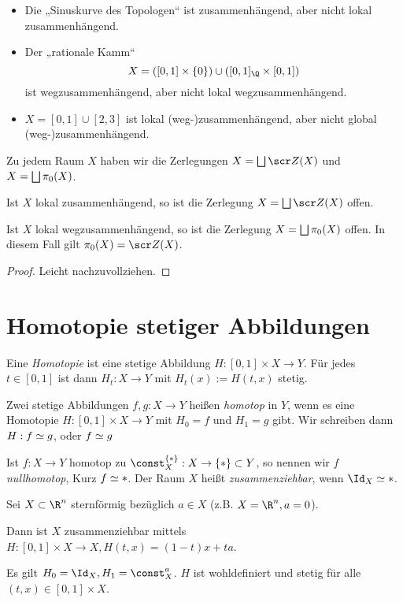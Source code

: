 \begin{ex}
	\begin{itemize}
		\item
			Die „Sinuskurve des Topologen“ %
			ist zusammenhängend, aber nicht lokal zusammenhängend.
		\item
			Der „rationale Kamm“
			\[
				X = ([0,1] \times \{0\}) \cup ([0,1]_\Q \times [0,1])
			\]
			ist wegzusammenhängend, aber nicht lokal wegzusammenhängend.
		\item
			$X = [0,1] \cup [2,3]$ ist lokal (weg-)zusammenhängend, aber nicht global (weg-)zusammenhängend.
	\end{itemize}
\end{ex}

Zu jedem Raum $X$ haben wir die Zerlegungen $X = \bigdunion \scr Z(X)$ und $X = \bigsqcup \pi_0(X)$.

\begin{st}
	Ist $X$ lokal zusammenhängend, so ist die Zerlegung $X = \bigdunion \scr Z(X)$ offen.

	Ist $X$ lokal wegzusammenhängend, so ist die Zerlegung $X = \bigsqcup \pi_0(X)$ offen.
	In diesem Fall gilt $\pi_0(X) = \scr Z(X)$.
	\begin{proof}
		Leicht nachzuvollziehen.
	\end{proof}
\end{st}


\section{Homotopie stetiger Abbildungen}


\begin{df}
	Eine \emph{Homotopie} ist eine stetige Abbildung $H: [0,1] \times X \to Y$.
	Für jedes $t \in [0,1]$ ist dann $H_t: X \to Y$ mit $H_t(x) := H(t,x)$ stetig.

	Zwei stetige Abbildungen $f,g : X \to Y$ heißen \emph{homotop} in $Y$, wenn es eine Homotopie $H: [0,1] \times X \to Y$ mit $H_0 = f$ und $H_1 = g$ gibt.
	Wir schreiben dann $H: f \simeq g$, oder $f\simeq g$

	Ist $f: X \to  Y$ homotop zu $\const_X^{\{\ast\}}: X \to \{\ast\} \subset Y$, so nennen wir $f$ \emph{nullhomotop}, Kurz $f \simeq \ast$.
	Der Raum $X$ heißt \emph{zusammenziehbar}, wenn $\Id_X \homotopic \ast$.
\end{df}

\begin{ex}
	Sei $X \subset \R^n$ sternförmig bezüglich $a \in X$ (z.B. $X = \R^n, a = 0$).

	Dann ist $X$ zusammenziehbar mittels $H: [0,1] \times X \to X, H(t,x) = (1-t)x + ta$.

	Es gilt $H_0 = \Id_X, H_1 = \const_X^{a}$.
	$H$ ist wohldefiniert und stetig für alle $(t,x) \in [0,1] \times X$.
\end{ex}


